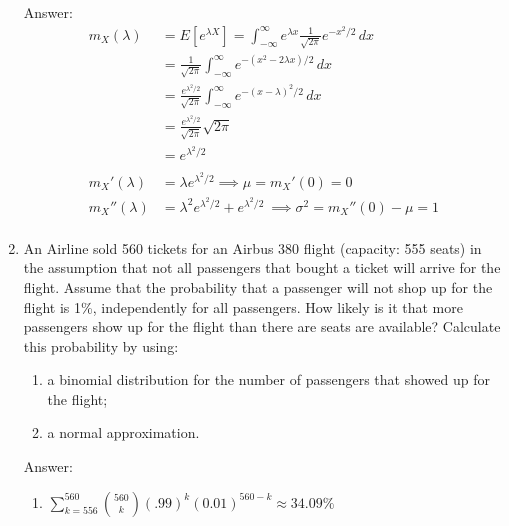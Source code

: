 \documentclass{article}
\begin{document}
\begin{enumerate}
Answer:
\begin{align*}
m_X(\lambda) &= E[e^{\lambda X}]
= \int_{-\infty}^\infty e^{\lambda x} \frac{1}{\sqrt{2\pi}} e^{-x^2 / 2} \, dx \\
&= \frac{1}{\sqrt{2\pi}} \int _{-\infty}^\infty e^{-(x^2 - 2\lambda x) /2} \, dx \\
&= \frac{e^{\lambda^2 / 2}}{\sqrt{2\pi}} \int_{-\infty}^\infty e^{-(x - \lambda)^2 / 2} \, dx \\
&=  \frac{e^{\lambda^2 / 2}}{\sqrt{2\pi}} \sqrt{2\pi}  \\
&= \boxed{e^{\lambda^2 / 2}} \\
& \\
m_X'(\lambda) &= \lambda e^{\lambda^2 /2} \implies \mu = m_X'(0) = 0 \\
m_X''(\lambda) &=  \lambda^2e^{\lambda^2 /2} +  e^{\lambda^2 / 2}\ \implies \sigma^2= m_X''(0) - \mu = 1 \\
\end{align*}

\item
An Airline sold 560 tickets for an Airbus 380 flight (capacity: 555 seats) in the
assumption that not all passengers that bought a ticket will arrive for the flight.
Assume that the probability that a passenger will not shop up for the flight is 1\%,
independently for all passengers. How likely is it that more passengers show
up for the flight than there are seats are available? Calculate this probability by using:

\begin{enumerate}
\item
a binomial distribution for the number of passengers that showed up for the flight;
\item
a normal approximation.
\end{enumerate}

Answer:

\begin{enumerate}
\item
$\sum_{k=556}^{560} \binom{560}{k}(.99)^k(0.01)^{560-k} \approx 34.09\%$


\end{enumerate}
\end{enumerate}
\end{document}
